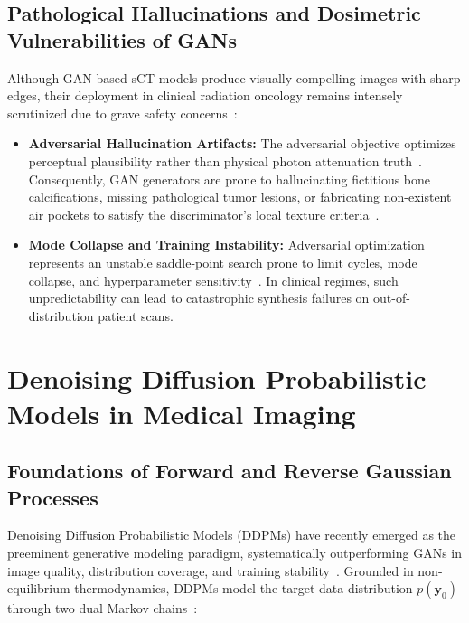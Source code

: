 \subsection{Pathological Hallucinations and Dosimetric Vulnerabilities of GANs}
Although GAN-based sCT models produce visually compelling images with sharp edges, their deployment in clinical radiation oncology remains intensely scrutinized due to grave safety concerns~\cite{edmund2017review,kazerouni2023diffusion,thummerer2023synthrad2023}:
\begin{itemize}
    \item \textbf{Adversarial Hallucination Artifacts:} The adversarial objective optimizes perceptual plausibility rather than physical photon attenuation truth~\cite{kazerouni2023diffusion}. Consequently, GAN generators are prone to hallucinating fictitious bone calcifications, missing pathological tumor lesions, or fabricating non-existent air pockets to satisfy the discriminator's local texture criteria~\cite{thummerer2023synthrad2023,armanious2020medgan}.
    \item \textbf{Mode Collapse and Training Instability:} Adversarial optimization represents an unstable saddle-point search prone to limit cycles, mode collapse, and hyperparameter sensitivity~\cite{dhariwal2021diffusion}. In clinical regimes, such unpredictability can lead to catastrophic synthesis failures on out-of-distribution patient scans.
\end{itemize}

\section{Denoising Diffusion Probabilistic Models in Medical Imaging}

\subsection{Foundations of Forward and Reverse Gaussian Processes}
Denoising Diffusion Probabilistic Models (DDPMs) have recently emerged as the preeminent generative modeling paradigm, systematically outperforming GANs in image quality, distribution coverage, and training stability~\cite{ho2020denoising,dhariwal2021diffusion}. Grounded in non-equilibrium thermodynamics, DDPMs model the target data distribution $p(\mathbf{y}_0)$ through two dual Markov chains~\cite{ho2020denoising}:

